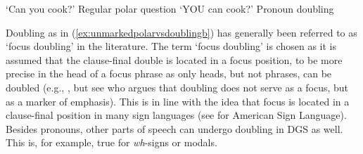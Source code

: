 \vspace{-0.2cm}

\begin{exe}
\ex\label{unmarkedpolarvsdoubling}\begin{xlist}
\ex {}
\glt `Can you cook?' \label{ex:unmarkedpolarvsdoublinga}\hfill Regular polar question
\ex {} 
%
%
\glt `YOU can cook?' \label{ex:unmarkedpolarvsdoublingb}\hfill Pronoun doubling

\end{xlist}
\end{exe}
 

\noindent Doubling as in (\ref{ex:unmarkedpolarvsdoublingb}) has generally been referred to as `focus doubling' in the literature. The term `focus doubling' is chosen as it is assumed that the clause-final double is located in a focus position, to be more precise in the head of a focus phrase as only heads, but not phrases, can be doubled (e.g., \citealt{de1999phrase, sandler2006sign}, but see \citealt{wilbur2012informationstructure} who argues that doubling does not serve as a focus, but as a marker of emphasis). This is in line with the idea that focus is located in a clause-final position in many sign languages (see \citealt{wilbur1991intonation, wilbur1994foregrounding, wilbur1996evidence, wilbur1997prosodic} for American Sign Language). Besides pronouns, other parts of speech can undergo doubling in DGS as well. This is, for example, true for \textit{wh}-signs or modals. 

